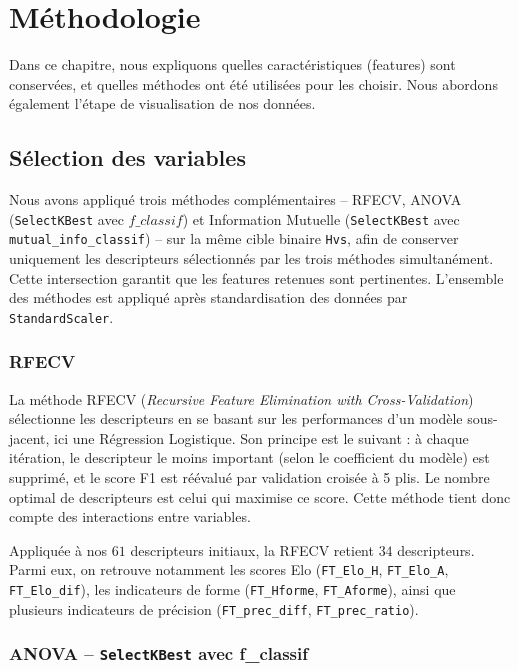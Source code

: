 \chapter{Méthodologie}

Dans ce chapitre, nous expliquons quelles caractéristiques (features) 
sont conservées, et quelles méthodes ont été utilisées pour les choisir. Nous abordons 
également l'étape de visualisation de nos données.

\section{Sélection des variables}
Nous avons appliqué trois méthodes complémentaires -- RFECV, ANOVA (\texttt{SelectKBest} avec $f\_classif$) 
et Information Mutuelle (\texttt{SelectKBest}
avec \texttt{mutual\_info\_classif}) -- sur la même cible binaire \texttt{Hvs}, afin de
conserver uniquement les descripteurs sélectionnés par les trois méthodes simultanément.
Cette intersection garantit que les features retenues sont pertinentes. L'ensemble
des méthodes est appliqué après standardisation des données par \texttt{StandardScaler}.

\subsection{RFECV}

La méthode RFECV (\textit{Recursive Feature Elimination with Cross-Validation}) sélectionne 
les descripteurs en se basant sur les
performances d'un modèle sous-jacent, ici une Régression Logistique. Son principe est
le suivant : à chaque itération, le descripteur le moins important (selon le coefficient du
modèle) est supprimé, et le score F1 est réévalué par validation croisée à 5 plis. Le
nombre optimal de descripteurs est celui qui maximise ce score. Cette méthode tient donc
compte des interactions entre variables.

Appliquée à nos $61$ descripteurs initiaux, la
RFECV retient $34$ descripteurs. Parmi eux, on retrouve notamment les scores Elo
(\texttt{FT\_Elo\_H}, \texttt{FT\_Elo\_A}, \texttt{FT\_Elo\_dif}), les indicateurs de
forme (\texttt{FT\_Hforme}, \texttt{FT\_Aforme}), ainsi que plusieurs indicateurs de
précision (\texttt{FT\_prec\_diff}, \texttt{FT\_prec\_ratio}).

\subsection{ANOVA -- \texttt{SelectKBest} avec f\_classif}

